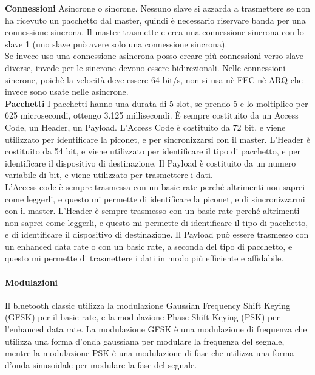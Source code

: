 \textbf{Connessioni}
Asincrone o sincrone. Nessuno slave si azzarda a trasmettere se non ha ricevuto un pacchetto dal master, quindi è necessario riservare banda per una connessione sincrona. Il master trasmette e crea una connessione sincrona con lo slave 1 (uno slave può avere solo una connessione sincrona).\\
Se invece uso una connessione asincrona posso creare più connessioni verso slave diverse, invede per le sincrone devono essere bidirezionali. 
Nelle connessioni sincrone, poichè la velocità deve essere 64 bit/s, non si usa nè FEC nè ARQ che invece sono usate nelle asincrone.\\

\textbf{Pacchetti}
I pacchetti hanno una durata di 5 slot, se prendo 5 e lo moltiplico per 625 microsecondi, ottengo 3.125 millisecondi. È sempre costituito da un Access Code, un Header, un Payload. 
L'Access Code è costituito da 72 bit, e viene utilizzato per identificare la piconet, e per sincronizzarsi con il master. L'Header è costituito da 54 bit, e viene utilizzato per identificare il tipo di pacchetto, e per identificare il dispositivo di destinazione. Il Payload è costituito da un numero variabile di bit, e viene utilizzato per trasmettere i dati.\\
L'Access code è sempre trasmessa con un basic rate perché altrimenti non saprei come leggerli, e questo mi permette di identificare la piconet, e di sincronizzarmi con il master. L'Header è sempre trasmesso con un basic rate perché altrimenti non saprei come leggerli, e questo mi permette di identificare il tipo di pacchetto, e di identificare il dispositivo di destinazione. Il Payload può essere trasmesso con un enhanced data rate o con un basic rate, a seconda del tipo di pacchetto, e questo mi permette di trasmettere i dati in modo più efficiente e affidabile.\\

\paragraph{Modulazioni}
Il bluetooth classic utilizza la modulazione Gaussian Frequency Shift Keying (GFSK) per il basic rate, e la modulazione Phase Shift Keying (PSK) per l'enhanced data rate. La modulazione GFSK è una modulazione di frequenza che utilizza una forma d'onda gaussiana per modulare la frequenza del segnale, mentre la modulazione PSK è una modulazione di fase che utilizza una forma d'onda sinusoidale per modulare la fase del segnale.\\

